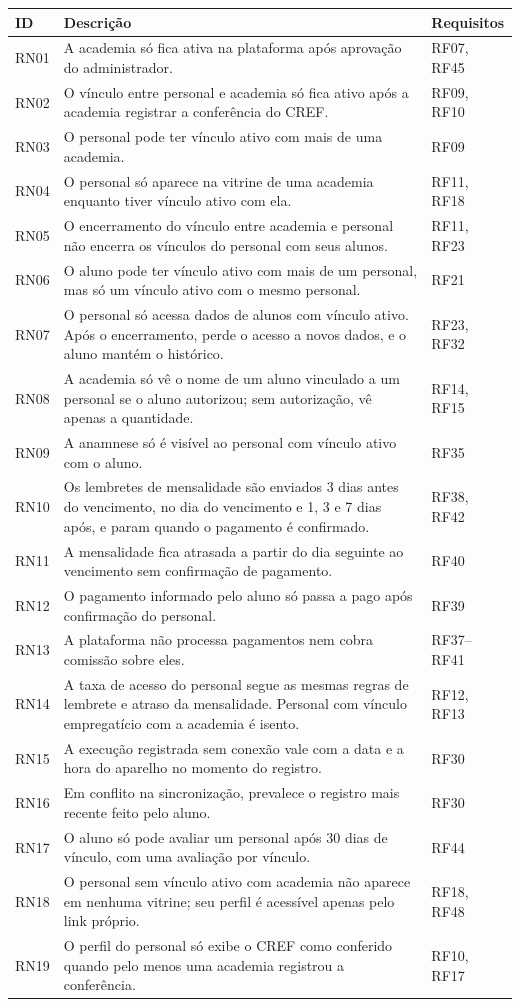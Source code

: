 \begin{tabularx}{\textwidth}{@{}l L l@{}}
  \toprule
  \textbf{ID} & \textbf{Descrição} & \textbf{Requisitos} \\
  \midrule
  RN01 & A academia só fica ativa na plataforma após aprovação do administrador. & RF07, RF45 \\
  RN02 & O vínculo entre personal e academia só fica ativo após a academia registrar a conferência do CREF. & RF09, RF10 \\
  RN03 & O personal pode ter vínculo ativo com mais de uma academia. & RF09 \\
  RN04 & O personal só aparece na vitrine de uma academia enquanto tiver vínculo ativo com ela. & RF11, RF18 \\
  RN05 & O encerramento do vínculo entre academia e personal não encerra os vínculos do personal com seus alunos. & RF11, RF23 \\
  RN06 & O aluno pode ter vínculo ativo com mais de um personal, mas só um vínculo ativo com o mesmo personal. & RF21 \\
  RN07 & O personal só acessa dados de alunos com vínculo ativo. Após o encerramento, perde o acesso a novos dados, e o aluno mantém o histórico. & RF23, RF32 \\
  RN08 & A academia só vê o nome de um aluno vinculado a um personal se o aluno autorizou; sem autorização, vê apenas a quantidade. & RF14, RF15 \\
  RN09 & A anamnese só é visível ao personal com vínculo ativo com o aluno. & RF35 \\
  RN10 & Os lembretes de mensalidade são enviados 3 dias antes do vencimento, no dia do vencimento e 1, 3 e 7 dias após, e param quando o pagamento é confirmado. & RF38, RF42 \\
  RN11 & A mensalidade fica atrasada a partir do dia seguinte ao vencimento sem confirmação de pagamento. & RF40 \\
  RN12 & O pagamento informado pelo aluno só passa a pago após confirmação do personal. & RF39 \\
  RN13 & A plataforma não processa pagamentos nem cobra comissão sobre eles. & RF37--RF41 \\
  RN14 & A taxa de acesso do personal segue as mesmas regras de lembrete e atraso da mensalidade. Personal com vínculo empregatício com a academia é isento. & RF12, RF13 \\
  RN15 & A execução registrada sem conexão vale com a data e a hora do aparelho no momento do registro. & RF30 \\
  RN16 & Em conflito na sincronização, prevalece o registro mais recente feito pelo aluno. & RF30 \\
  RN17 & O aluno só pode avaliar um personal após 30 dias de vínculo, com uma avaliação por vínculo. & RF44 \\
  RN18 & O personal sem vínculo ativo com academia não aparece em nenhuma vitrine; seu perfil é acessível apenas pelo link próprio. & RF18, RF48 \\
  RN19 & O perfil do personal só exibe o CREF como conferido quando pelo menos uma academia registrou a conferência. & RF10, RF17 \\
  \bottomrule
\end{tabularx}

